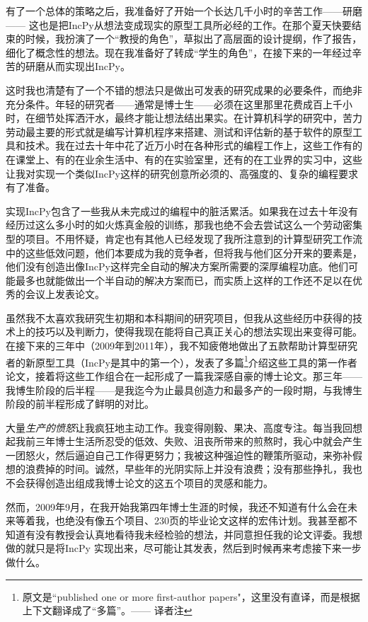 \documentclass[letter,12pt]{book}
\begin{document}
\begin{CJK}{UTF8}{gbsn}
有了一个总体的策略之后，我准备好了开始一个长达几千小时的辛苦工作——研磨—— 这也是把IncPy从想法变成现实的原型工具所必经的工作。在那个夏天快要结束的时候，我扮演了一个“教授的角色”，草拟出了高层面的设计提纲，作了报告，细化了概念性的想法。现在我准备好了转成“学生的角色”，在接下来的一年经过辛苦的研磨从而实现出IncPy。

\breakline

这时我也清楚有了一个不错的想法只是做出可发表的研究成果的必要条件，而绝非充分条件。年轻的研究者——通常是博士生——必须在这里那里花费成百上千小时，在细节处挥洒汗水，最终才能让想法结出果实。在计算机科学的研究中，苦力劳动最主要的形式就是编写计算机程序来搭建、测试和评估新的基于软件的原型工具和技术。我在过去十年中花了近万小时在各种形式的编程工作上，这些工作有的在课堂上、有的在业余生活中、有的在实验室里，还有的在工业界的实习中，这些让我对实现一个类似IncPy这样的研究创意所必须的、高强度的、复杂的编程要求有了准备。

实现IncPy包含了一些我从未完成过的编程中的脏活累活。如果我在过去十年没有经历过这么多小时的如火炼真金般的训练，那我也绝不会去尝试这么一个劳动密集型的项目。不用怀疑，肯定也有其他人已经发现了我所注意到的计算型研究工作流中的这些低效问题，他们本要成为我的竞争者，但将我与他们区分开来的要素是，他们没有创造出像IncPy这样完全自动的解决方案所需要的深厚编程功底。他们可能最多也就能做出一个半自动的解决方案而已，而实质上这样的工作还不足以在优秀的会议上发表论文。

虽然我不太喜欢我研究生初期和本科期间的研究项目，但我从这些经历中获得的技术上的技巧以及判断力，使得我现在能将自己真正关心的想法实现出来变得可能。在接下来的三年中（2009年到2011年），我不知疲倦地做出了五款帮助计算型研究者的新原型工具（IncPy是其中的第一个），发表了多篇\footnote{原文是``published one or more first-author papers"，这里没有直译，而是根据上下文翻译成了“多篇”。—— 译者注}介绍这些工具的第一作者论文，接着将这些工作组合在一起形成了一篇我深感自豪的博士论文。那三年——我博生阶段的后半程——是我迄今为止最具创造力和最多产的一段时期，与我博生阶段的前半程形成了鲜明的对比。

大量\emph{生产的愤怒}让我疯狂地主动工作。我变得刚毅、果决、高度专注。每当我回想起我前三年博士生活所忍受的低效、失败、沮丧所带来的煎熬时，我心中就会产生一团怒火，然后逼迫自己工作得更努力；我被这种强迫性的鞭策所驱动，来弥补假想的浪费掉的时间。诚然，早些年的光阴实际上并没有浪费；没有那些挣扎，我也不会获得创造出组成我博士论文的这五个项目的灵感和能力。

\breakline

然而，2009年9月，在我开始我第四年博士生涯的时候，我还不知道有什么会在未来等着我，也绝没有像五个项目、230页的毕业论文这样的宏伟计划。我甚至都不知道有没有教授会认真地看待我未经检验的想法，并同意担任我的论文评委。我想做的就只是将IncPy 实现出来，尽可能让其发表，然后到时候再来考虑接下来一步做什么。


\end{CJK}
\end{document}
